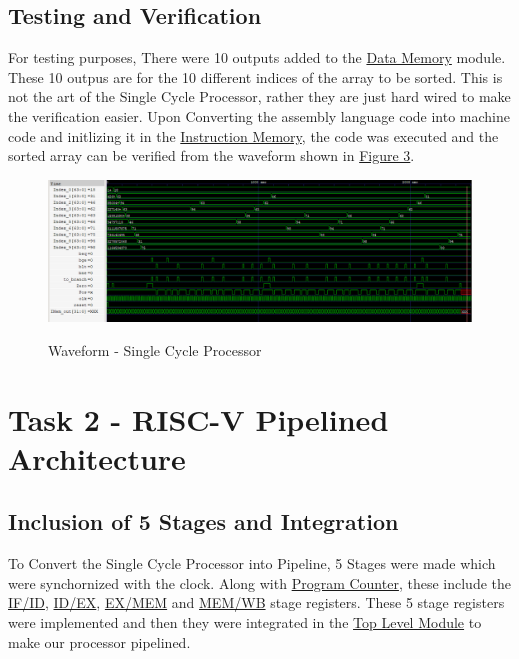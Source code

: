 \documentclass[12pt]{article}
\begin{document}
\subsection*{\Large Testing and Verification}
For testing purposes, There were 10 outputs added to the \hyperref[dmem]{Data Memory} module. These 10 outpus are for the 10 different indices of the array to be sorted. This is not the art of the Single Cycle Processor, rather they are just hard wired to make the verification easier. Upon Converting the assembly language code into machine code and initlizing it in the \hyperref[imem]{Instruction Memory}, the code was executed and the sorted array can be verified from the waveform shown in \hyperref[img3]{Figure 3}.
\begin{figure}[H]
    \centering
    \includegraphics[scale = 0.5]{../images/SCP Wave.png}
    \label{img3}
    \caption{Waveform - Single Cycle Processor}
\end{figure}
\section*{\Huge Task 2 - RISC-V Pipelined Architecture}
\subsection*{\Large Inclusion of 5 Stages and Integration}
To Convert the Single Cycle Processor into Pipeline, 5 Stages were made which were synchornized with the clock. Along with \hyperref[pc]{Program Counter}, these include the \hyperref[if_id]{IF/ID}, \hyperref[id_ex]{ID/EX}, \hyperref[ex_mem]{EX/MEM} and \hyperref[mem_wb]{MEM/WB} stage registers. These 5 stage registers were implemented and then they were integrated in the \hyperref[tlmp]{Top Level Module} to make our processor pipelined.
\end{document}
